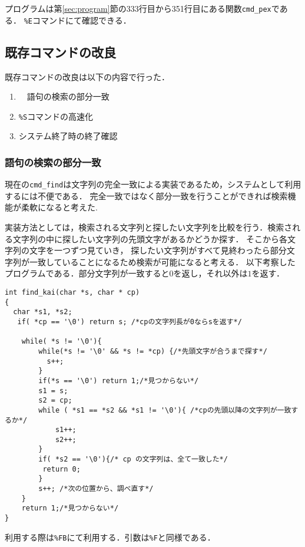 \documentclass[a4j,11pt]{jarticle}
\begin{document}
プログラムは第\ref{sec:program}節の333行目から351行目にある関数\verb|cmd_pex|である．
\verb|%E|コマンドにて確認できる．
\subsection{既存コマンドの改良}\label{sec:kison}
既存コマンドの改良は以下の内容で行った．
\begin{enumerate}
\setlength{\parskip}{2pt} \setlength{\itemsep}{2pt}
    \item　語句の検索の部分一致
    \item \verb|%S|コマンドの高速化
    \item システム終了時の終了確認
\end{enumerate}
\subsubsection{語句の検索の部分一致}
現在の\verb|cmd_find|は文字列の完全一致による実装であるため，システムとして利用するには不便である．
完全一致ではなく部分一致を行うことができれば検索機能が柔軟になると考えた.

実装方法としては，検索される文字列と探したい文字列を比較を行う．検索される文字列の中に探したい文字列の先頭文字があるかどうか探す．
そこから各文字列の文字を一つずつ見ていき，
探したい文字列がすべて見終わったら部分文字列が一致していることになるため検索が可能になると考える．
以下考察したプログラムである．部分文字列が一致すると$0$を返し，それ以外は$1$を返す．
\begin{verbatim}
int find_kai(char *s, char * cp)
{
  char *s1, *s2;
   if( *cp == '\0') return s; /*cpの文字列長が0ならsを返す*/ 

    while( *s != '\0'){
        while(*s != '\0' && *s != *cp) {/*先頭文字が合うまで探す*/
          s++;
        }
        if(*s == '\0') return 1;/*見つからない*/
        s1 = s;
        s2 = cp;
        while ( *s1 == *s2 && *s1 != '\0'){ /*cpの先頭以降の文字列が一致するか*/
            s1++;
            s2++;
        }
        if( *s2 == '\0'){/* cp の文字列は、全て一致した*/
         return 0;
        }
        s++; /*次の位置から、調べ直す*/
    }
    return 1;/*見つからない*/
}
\end{verbatim}
利用する際は\verb|%FB|にて利用する．引数は\verb|%F|と同様である．
\end{document}
